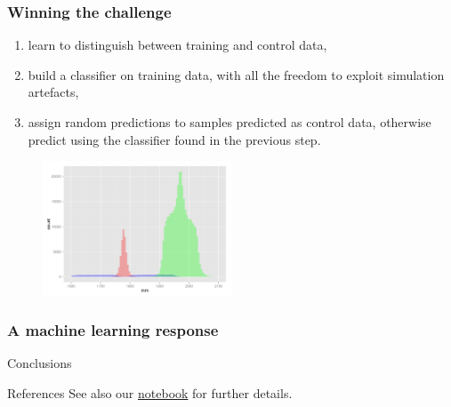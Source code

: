 \documentclass{beamer}
\begin{document}
\begin{frame}
  \frametitle{Winning the challenge}

%

\begin{enumerate}
\item learn to distinguish between training and control data,
\item build a classifier on training data, with all the freedom to exploit simulation artefacts,
\item assign random predictions to samples predicted as control data, otherwise predict using the classifier found in the previous step.
\end{enumerate}

\begin{figure}
\centering
\includegraphics[width=0.5\textwidth]{hole.png}
\end{figure}

\end{frame}

\begin{frame}
  \frametitle{A machine learning response}

\end{frame}

\begin{frame}[t]{Conclusions}
    
\end{frame}

\begin{frame}[t]{References}
    See also our \href{https://github.com/glouppe/notebooks/blob/master/Classification\%20with\%20a\%20control\%20channel.ipynb}{notebook} for further details.
\end{frame}
\end{document}
